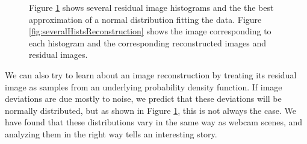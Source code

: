 \begin{figure}[htp]
	\centering
	
	
		\caption[Several residual image histograms.]{Figure \ref{fig:severalHists} shows several residual image histograms and the the best approximation of a normal distribution fitting the data.  Figure \ref{fig:severalHistsReconstruction} shows the image corresponding to each histogram and the corresponding reconstructed images and residual images.}
		\label{fig:severalHists}
\end{figure}

We can also try to learn about an image reconstruction by treating its residual image as samples from an 
underlying probability density function.  If image deviations are due mostly to noise, we predict that these deviations will be normally distributed, but as shown in Figure \ref{fig:severalHists}, this is not always the case.  We have found that these distributions vary in the same way as webcam scenes, and analyzing them in the right way tells an interesting story.



